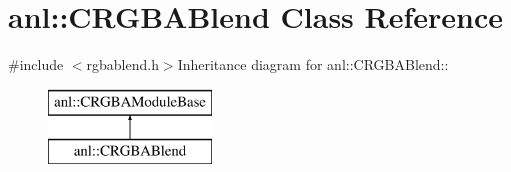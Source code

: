 \hypertarget{classanl_1_1CRGBABlend}{
\section{anl::CRGBABlend Class Reference}
\label{classanl_1_1CRGBABlend}
}


{\ttfamily \#include $<$rgbablend.h$>$}Inheritance diagram for anl::CRGBABlend::\begin{figure}[H]
\begin{center}
\leavevmode
\includegraphics[height=2cm]{classanl_1_1CRGBABlend}
\end{center}
\end{figure}
